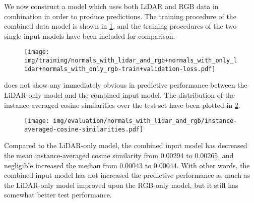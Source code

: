 We now construct a model which uses both LiDAR and RGB data in combination in order to produce predictions.
The training procedure of the combined data model is shown in \cref{fig:combined-training}, and the training procedures of the two single-input models have been included for comparison.
%
\begin{figure}[H]
  \texttt{[image: img/training/normals\_with\_lidar\_and\_rgb+normals\_with\_only\_lidar+normals\_with\_only\_rgb-train+validation-loss.pdf]}
  \label{fig:combined-training}
\end{figure}
\noindent
{} does not show any immediately obvious in predictive performance between the LiDAR-only model and the combined input model.
The distribution of the instance-averaged cosine similarities over the test set have been plotted in \cref{fig:combined-test-distribution}.
%
\begin{figure}[H]
  \texttt{[image: img/evaluation/normals\_with\_lidar\_and\_rgb/instance-averaged-cosine-similarities.pdf]}
  \label{fig:combined-test-distribution}
\end{figure}
%
Compared to the LiDAR-only model, the combined input model has decreased the mean instance-averaged cosine similarity from \num{0.00294} to \num{0.00265}, and negligible increased the median from \num{0.00043} to \num{0.00044}.
With other words, the combined input model has not increased the predictive performance as much as the LiDAR-only model improved upon the RGB-only model, but it still has somewhat better test performance.

